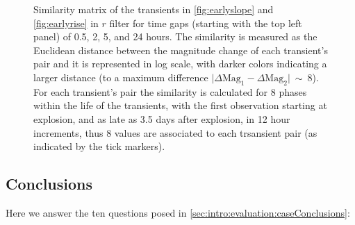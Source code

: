 \begin{figure}[hbt]
    
  
    \caption{Similarity matrix of the transients in \autoref{fig:earlyslope} and \autoref{fig:earlyrise} in $r$ filter for time gaps (starting with the top left panel) of  0.5, 2, 5, and 24 hours.  The similarity is measured as the Euclidean distance between the magnitude change of each transient's pair and it is represented in log scale, with darker colors indicating a larger distance (to a maximum difference $\lvert{\Delta\mathrm{Mag}_1 - \Delta\mathrm{Mag}_2}\rvert ~\sim~8$). For each transient's pair the similarity is calculated for 8 phases within the life of the transients, with the first observation starting at explosion, and as late as 3.5 days after explosion, in 12 hour increments, thus 8 values are associated to each trsansient pair (as indicated by the tick markers).}
  \label{fig:simmatrix}
\end{figure}


 \subsection{Conclusions}

 Here we answer the ten questions posed in
 \autoref{sec:intro:evaluation:caseConclusions}:

